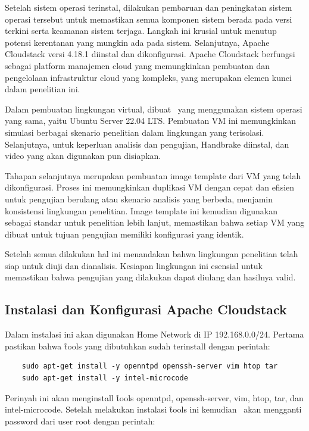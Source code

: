 Setelah sistem operasi terinstal, dilakukan pembaruan dan peningkatan sistem operasi tersebut untuk memastikan semua komponen sistem berada pada versi terkini serta keamanan sistem terjaga. Langkah ini krusial untuk menutup potensi kerentanan yang mungkin ada pada sistem. Selanjutnya, Apache Cloudstack versi 4.18.1 diinstal dan dikonfigurasi. Apache Cloudstack berfungsi sebagai platform manajemen cloud yang memungkinkan pembuatan dan pengelolaan infrastruktur cloud yang kompleks, yang merupakan elemen kunci dalam penelitian ini.

Dalam pembuatan lingkungan virtual, dibuat \vm\ yang menggunakan sistem operasi yang sama, yaitu Ubuntu Server 22.04 LTS. Pembuatan VM ini memungkinkan simulasi berbagai skenario penelitian dalam lingkungan yang terisolasi. Selanjutnya, untuk keperluan analisis dan pengujian, Handbrake diinstal, dan video yang akan digunakan pun disiapkan.

Tahapan selanjutnya merupakan pembuatan image template dari VM yang telah dikonfigurasi. Proses ini memungkinkan duplikasi VM dengan cepat dan efisien untuk pengujian berulang atau skenario analisis yang berbeda, menjamin konsistensi lingkungan penelitian. Image template ini kemudian digunakan sebagai standar untuk penelitian lebih lanjut, memastikan bahwa setiap VM yang dibuat untuk tujuan pengujian memiliki konfigurasi yang identik.

Setelah semua dilakukan hal ini menandakan bahwa lingkungan penelitian telah siap untuk diuji dan dianalisis. Kesiapan lingkungan ini esensial untuk memastikan bahwa pengujian yang dilakukan dapat diulang dan hasilnya valid.

\subsection{Instalasi dan Konfigurasi Apache Cloudstack}
Dalam instalasi ini akan digunakan \f{Home Network} di IP 192.168.0.0/24. Pertama pastikan bahwa \f{tools} yang dibutuhkan sudah terinstall dengan perintah:

\begin{verbatim}
    sudo apt-get install -y openntpd openssh-server vim htop tar
    sudo apt-get install -y intel-microcode
\end{verbatim}

Perinyah ini akan menginstall \f{tools} openntpd, openssh-server, vim, htop, tar, dan intel-microcode. Setelah melakukan instalasi \f{tools} ini kemudian \saya\ akan mengganti password dari user root dengan perintah:

